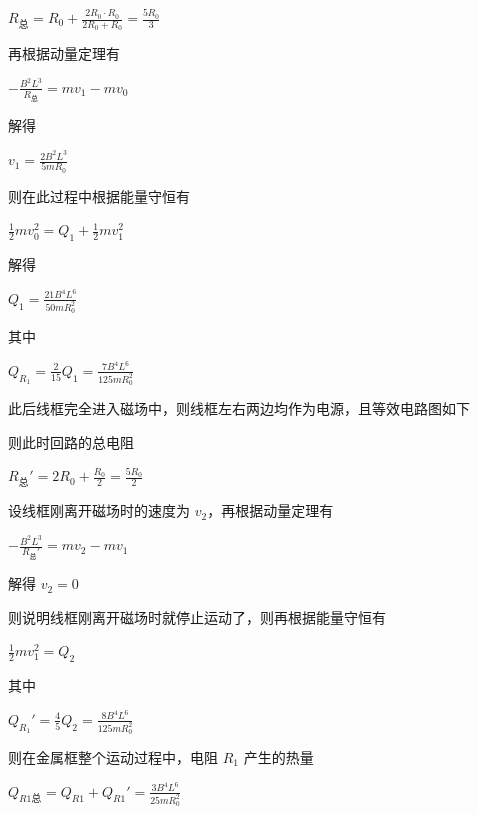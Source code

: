 \documentclass[\gkver]{gaokaozhenti}
\begin{document}
\begin{enumerate}
{$R_{\text{总}}=R_{0}+\frac{2R_{0}\cdot R_{0}}{2R_{0}+R_{0}}=\frac{5R_{0}}{3}$

再根据动量定理有

$-\frac{B^{2}L^{3}}{R_{\text{总}}}=mv_{1}-mv_{0}$

解得

$v_{1}=\frac{2B^{2}L^{3}}{5mR_{0}}$

则在此过程中根据能量守恒有

$\frac{1}{2}mv_{0}^{2}=Q_{1}+\frac{1}{2}mv_{1}^{2}$

解得

$Q_{1}=\frac{21B^{4}L^{6}}{50mR_{0}^{2}}$

其中

$Q_{R_{1}}=\frac{2}{15}Q_{1}=\frac{7B^{4}L^{6}}{125mR_{0}^{2}}$

此后线框完全进入磁场中，则线框左右两边均作为电源，且等效电路图如下


则此时回路的总电阻

$R_{\text{总}}'=2R_{0}+\frac{R_{0}}{2}=\frac{5R_{0}}{2}$

设线框刚离开磁场时的速度为 $v_{2}$，再根据动量定理有

$-\frac{B^{2}L^{3}}{R_{\text{总}}'}=mv_{2}-mv_{1}$

解得 $v_{2}=0$

则说明线框刚离开磁场时就停止运动了，则再根据能量守恒有

$\frac{1}{2}mv_{1}^{2}=Q_{2}$

其中

$Q_{R_{1}}'=\frac{4}{5}Q_{2}=\frac{8B^{4}L^{6}}{125mR_{0}^{2}}$

则在金属框整个运动过程中，电阻 $R_{1}$ 产生的热量

$Q_{R1\text{总}}=Q_{R1}+Q_{R1}'=\frac{3B^{4}L^{6}}{25mR_{0}^{2}}$
}

\end{enumerate}
\end{document}

